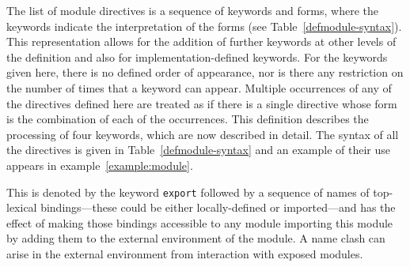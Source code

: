 \label{directives}
%
\begin{optDefinition}
The list of module directives is a sequence of keywords and forms, where the
keywords indicate the interpretation of the forms (see
Table~\ref{defmodule-syntax}).  This representation allows for the addition of
further keywords at other levels of the definition and also for
implementation-defined keywords.  For the keywords given here, there is no defined order of
appearance, nor is there any restriction on the number of times that a keyword
can appear.  Multiple occurrences of any of the directives defined here are
treated as if there is a single directive whose form is the combination of each
of the occurrences.  This definition describes the processing of four keywords,
which are now described in detail.  The syntax of all the directives is given in
Table~\ref{defmodule-syntax} and an example of their use appears in
example~\ref{example:module}.
\end{optDefinition}
%
%
\begin{optDefinition}
This is denoted by the keyword {\tt export} followed by a sequence of
names of top-lexical bindings---these could be either locally-defined or
imported---and has the effect of making those bindings accessible to any module
importing this module by adding them to the external environment of the module.
A name clash can arise in the external environment from interaction with exposed
modules.
\end{optDefinition}
%
%
\label{import}
%
